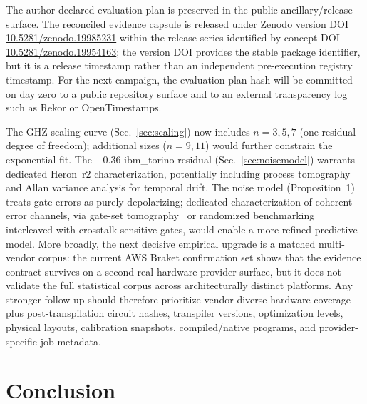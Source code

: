 \documentclass[aps,prxquantum,twocolumn,superscriptaddress,amsmath,amssymb,longbibliography,floatfix]{revtex4-2}
\begin{document}
The author-declared evaluation plan is preserved in the public ancillary/release surface. The reconciled evidence capsule is released under Zenodo version DOI \href{https://doi.org/10.5281/zenodo.19985231}{10.5281/zenodo.19985231} within the release series identified by concept DOI \href{https://doi.org/10.5281/zenodo.19954163}{10.5281/zenodo.19954163}; the version DOI provides the stable package identifier, but it is a release timestamp rather than an independent pre-execution registry timestamp. For the next campaign, the evaluation-plan hash will be committed on day zero to a public repository surface and to an external transparency log such as Rekor or OpenTimestamps.

The GHZ scaling curve (Sec.~\ref{sec:scaling}) now includes $n{=}3,5,7$ (one residual degree of freedom); additional sizes ($n{=}9,11$) would further constrain the exponential fit. The $-0.36$ ibm\_torino residual (Sec.~\ref{sec:noisemodel}) warrants dedicated Heron~r2 characterization, potentially including process tomography and Allan variance analysis for temporal drift. The noise model (Proposition~1) treats gate errors as purely depolarizing; dedicated characterization of coherent error channels, via gate-set tomography~\cite{Merkel2013} or randomized benchmarking interleaved with crosstalk-sensitive gates, would enable a more refined predictive model. More broadly, the next decisive empirical upgrade is a matched multi-vendor corpus: the current AWS Braket confirmation set shows that the evidence contract survives on a second real-hardware provider surface, but it does not validate the full statistical corpus across architecturally distinct platforms. Any stronger follow-up should therefore prioritize vendor-diverse hardware coverage plus post-transpilation circuit hashes, transpiler versions, optimization levels, physical layouts, calibration snapshots, compiled/native programs, and provider-specific job metadata.

\section{Conclusion}
\label{sec:conclusion}
\end{document}
